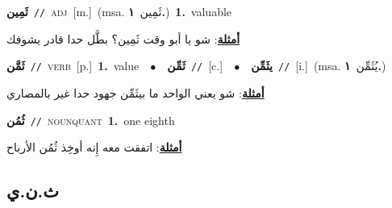 \documentclass[10pt,a4paper,twoside]{article} %
\begin{document}
\begin{multicols}{2}
{\setlength\topsep{0pt}\textbf{\foreignlanguage{arabic}{ثَمِين}}\ {\color{gray}\texttt{//}\color{black}}\ \textsc{adj}\ [m.]\ \color{gray}(msa. \foreignlanguage{arabic}{ثَمِين}~\foreignlanguage{arabic}{\textbf{١.}})\color{black}\ \textbf{1.}~valuable\  \begin{flushright}\color{gray}\foreignlanguage{arabic}{\textbf{\underline{\foreignlanguage{arabic}{أمثلة}}}: شو يا أبو وقت ثَمِين؟ بطَّل حدا قادر يشوفك}\end{flushright}\color{black}} \vspace{2mm}

{\setlength\topsep{0pt}\textbf{\foreignlanguage{arabic}{ثَمَّن}}\ {\color{gray}\texttt{//}\color{black}}\ \textsc{verb}\ [p.]\ \textbf{1.}~value\ \ $\bullet$\ \ \setlength\topsep{0pt}\textbf{\foreignlanguage{arabic}{ثَمِّن}}\ {\color{gray}\texttt{//}\color{black}}\ [c.]\ \ $\bullet$\ \ \setlength\topsep{0pt}\textbf{\foreignlanguage{arabic}{يثَمِّن}}\ {\color{gray}\texttt{//}\color{black}}\ [i.]\ \color{gray}(msa. \foreignlanguage{arabic}{يُثَمِّن}~\foreignlanguage{arabic}{\textbf{١.}})\color{black}\  \begin{flushright}\color{gray}\foreignlanguage{arabic}{\textbf{\underline{\foreignlanguage{arabic}{أمثلة}}}: شو يعني الواحد ما بيثَمِّن جهود حدا غير بالمصاري}\end{flushright}\color{black}} \vspace{2mm}

{\setlength\topsep{0pt}\textbf{\foreignlanguage{arabic}{ثُمُن}}\ {\color{gray}\texttt{//}\color{black}}\ \textsc{noun\textunderscore quant}\ \textbf{1.}~one eighth\  \begin{flushright}\color{gray}\foreignlanguage{arabic}{\textbf{\underline{\foreignlanguage{arabic}{أمثلة}}}: اتفقت معه إِنه أوخِذ ثُمُن الأرباح}\end{flushright}\color{black}} \vspace{2mm}

\vspace{-3mm}
\subsection*{\color{blue}\foreignlanguage{arabic}{ث.ن.ي}\color{blue}{}} 


\end{multicols}
\end{document}
